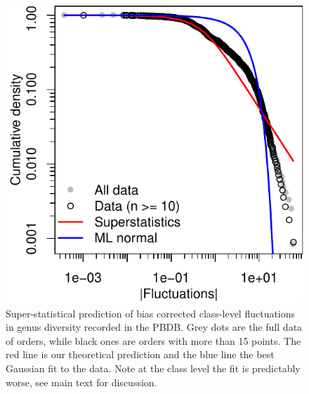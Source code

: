 \begin{figure}[!hp]
  \centering
  \includegraphics[scale=0.7]{figs/figSupp_Px_cls.pdf}
  \caption[Super-statistical prediction of bias corrected class-level
  data]{Super-statistical prediction of bias corrected class-level
    fluctuations in genus diversity recorded in the PBDB. Grey dots
    are the full data of orders, while black ones are orders with more
    than 15 points. The red line is our theoretical prediction and the
    blue line the best Gaussian fit to the data. Note at the class
    level the fit is predictably worse, see main text for discussion.}
  \label{fig:supp_PBDB_Px_cls}
\end{figure}

